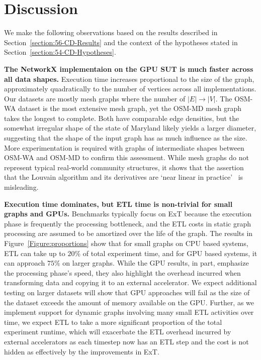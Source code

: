 \section{Discussion}
\label{section:57-CD-Discussion}
We make the following observations based on the results described in Section~\ref{section:56-CD-Results} and the context of the hypotheses stated in Section~\ref{section:54-CD-Hypotheses}.

\textbf{The NetworkX implementaion on the \ac{GPU} \ac{SUT} is much faster across all data shapes.}
Execution time increases proportional to the size of the graph, approximately quadratically to the number of vertices across all implementations. 
Our datasets are mostly mesh graphs where the number of $|E|\rightarrow|V|$. 
The OSM-WA dataset is the most extensive mesh graph, yet the OSM-MD mesh graph takes the longest to complete.
Both have comparable edge densities, but the somewhat irregular shape of the state of Maryland likely yields a larger diameter, suggesting that the shape of the input graph has as much influence as the size. 
More experimentation is required with graphs of intermediate shapes between OSM-WA and OSM-MD to confirm this assessment.
While mesh graphs do not represent typical real-world community structures, it shows that the assertion that the Louvain algorithm and its derivatives are `near linear in practice'~\cite{Blondel2008, Traag2019} is misleading.

\textbf{Execution time dominates, but ETL time is non-trivial for small graphs and \ac{GPU}s.}
Benchmarks typically focus on \ac{ExT} because the execution phase is frequently the processing bottleneck, and the \ac{ETL} costs in static graph processing are assumed to be amortized over the life of the graph.
The results in Figure~\ref{Figure:proportions} show that for small graphs on \ac{CPU} based systems, \ac{ETL} can take up to $20\%$ of total experiment time, and for \ac{GPU} based systems, it can approach $75\%$ on larger graphs.
While the \ac{GPU} results, in part, emphasize the processing phase's speed, they also highlight the overhead incurred when transforming data and copying it to an external accelerator.
We expect additional testing on larger datasets will show that \ac{GPU} approaches will fail as the size of the dataset exceeds the amount of memory available on the \ac{GPU}.
Further, as we implement support for dynamic graphs involving many small \ac{ETL} activities over time, we expect \ac{ETL} to take a more significant proportion of the total experiment runtime, which will exacerbate the \ac{ETL} overhead incurred by external accelerators as each timestep now has an \ac{ETL} step and the cost is not hidden as effectively by the improvements in \ac{ExT}.


